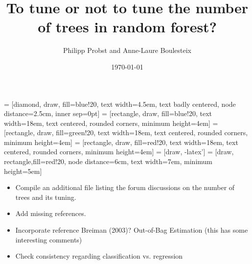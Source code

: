 \documentclass[paper=a4
               ,12pt
               ,DIV=12
               ,parskip=half
               ,titlepage=on
               ,headinclude 
               ,footinclude
               ,headsepline
               ,footsepline         %
               ,ilines 
               ]{scrartcl}
\title{To tune or not to tune the number of trees in random forest?}
\author{Philipp Probst and Anne-Laure Boulesteix}
\date{\today}
\subtitle{}
\begin{document}
 
\maketitle
 = [diamond, draw, fill=blue!20, 
    text width=4.5em, text badly centered, node distance=2.5cm, inner sep=0pt]
 = [rectangle, draw, fill=blue!20, 
    text width=18em, text centered, rounded corners, minimum height=4em]
 = [rectangle, draw, fill=green!20, 
    text width=18em, text centered, rounded corners, minimum height=4em]
 = [rectangle, draw, fill=red!20, 
    text width=18em, text centered, rounded corners, minimum height=4em]
 = [draw, -latex']
 = [draw, rectangle,fill=red!20, node distance=6cm, text width=7em,
    minimum height=5em]

\begin{itemize}
\item Compile an additional file listing the forum discussions on the number of trees and its tuning.
\item Add missing references.
\item Incorporate reference Breiman (2003)? Out-of-Bag Estimation (this has some interesting comments)
\item Check consistency regarding classification vs. regression
\end{itemize}
\end{document}
